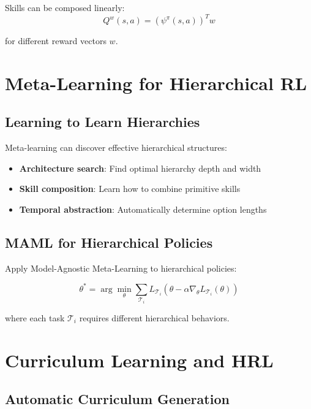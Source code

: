 Skills can be composed linearly:
\begin{equation}
Q^w(s, a) = (\psi^\pi(s, a))^T w
\end{equation}

for different reward vectors $w$.

\section{Meta-Learning for Hierarchical RL}

\subsection{Learning to Learn Hierarchies}

Meta-learning can discover effective hierarchical structures:

\begin{itemize}
    \item \textbf{Architecture search}: Find optimal hierarchy depth and width
    \item \textbf{Skill composition}: Learn how to combine primitive skills
    \item \textbf{Temporal abstraction}: Automatically determine option lengths
\end{itemize}

\subsection{MAML for Hierarchical Policies}

Apply Model-Agnostic Meta-Learning to hierarchical policies:

\begin{equation}
\theta^* = \arg\min_\theta \sum_{\mathcal{T}_i} L_{\mathcal{T}_i}(\theta - \alpha \nabla_\theta L_{\mathcal{T}_i}(\theta))
\end{equation}

where each task $\mathcal{T}_i$ requires different hierarchical behaviors.

\section{Curriculum Learning and HRL}

\subsection{Automatic Curriculum Generation}

